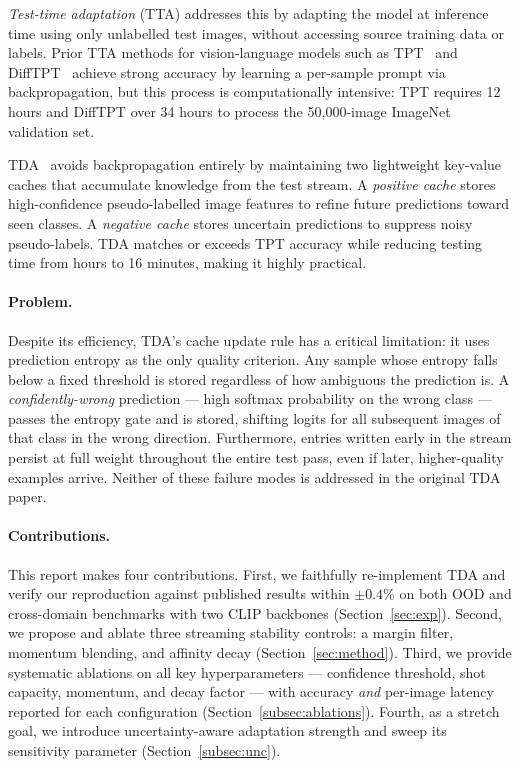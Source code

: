 \documentclass[10pt,twocolumn,letterpaper]{article}
\begin{document}
\emph{Test-time adaptation} (TTA) addresses this by adapting the
model at inference time using only unlabelled test images, without
accessing source training data or labels.
Prior TTA methods for vision-language models such as
TPT~\cite{shu2022tpt} and DiffTPT~\cite{feng2023difftpt} achieve
strong accuracy by learning a per-sample prompt via backpropagation,
but this process is computationally intensive: TPT requires 12 hours
and DiffTPT over 34 hours to process the 50,000-image ImageNet
validation set.

TDA~\cite{karmanov2024tda} avoids backpropagation entirely by
maintaining two lightweight key-value caches that accumulate
knowledge from the test stream.
A \emph{positive cache} stores high-confidence pseudo-labelled
image features to refine future predictions toward seen classes.
A \emph{negative cache} stores uncertain predictions to suppress
noisy pseudo-labels.
TDA matches or exceeds TPT accuracy while reducing testing time from
hours to 16 minutes, making it highly practical.

\paragraph{Problem.}
Despite its efficiency, TDA's cache update rule has a critical
limitation: it uses prediction entropy as the only quality criterion.
Any sample whose entropy falls below a fixed threshold is stored
regardless of how ambiguous the prediction is.
A \emph{confidently-wrong} prediction --- high softmax probability
on the wrong class --- passes the entropy gate and is stored,
shifting logits for all subsequent images of that class in the
wrong direction.
Furthermore, entries written early in the stream persist at full
weight throughout the entire test pass, even if later, higher-quality
examples arrive.
Neither of these failure modes is addressed in the original TDA paper.

\paragraph{Contributions.}
This report makes four contributions.
First, we faithfully re-implement TDA and verify our reproduction
against published results within $\pm0.4\%$ on both OOD and
cross-domain benchmarks with two CLIP backbones (Section~\ref{sec:exp}).
Second, we propose and ablate three streaming stability controls:
a margin filter, momentum blending, and affinity decay
(Section~\ref{sec:method}).
Third, we provide systematic ablations on all key hyperparameters
--- confidence threshold, shot capacity, momentum, and decay factor
--- with accuracy \emph{and} per-image latency reported for each
configuration (Section~\ref{subsec:ablations}).
Fourth, as a stretch goal, we introduce uncertainty-aware adaptation
strength and sweep its sensitivity parameter
(Section~\ref{subsec:unc}).
\end{document}
